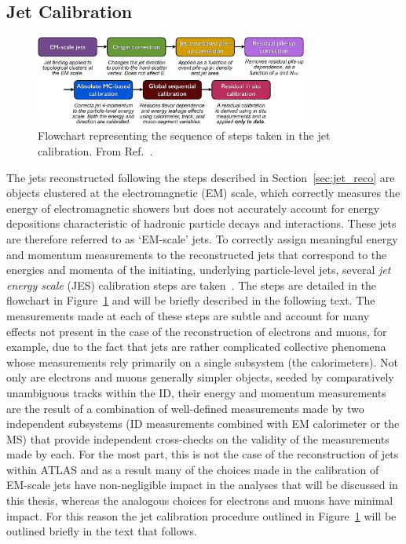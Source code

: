 \subsection{Jet Calibration}
\label{sec:jet_calib}

\begin{figure}[!htb]
    \begin{center}
        \includegraphics[width=0.8\textwidth]{figures/chapter3/jets/jes_calibration_sequence}
        \caption{
            Flowchart representing the sequence of steps taken in the jet calibration.
            From Ref.~\cite{Aaboud:2017jcu}.
        }
        \label{fig:jes_sequence}
    \end{center}
\end{figure}

The jets reconstructed following the steps described in Section~\ref{sec:jet_reco} are objects clustered
at the electromagnetic (EM) scale, which correctly measures the energy of electromagnetic showers but does not
accurately account for energy depositions characteristic of hadronic particle decays and interactions.
These jets are therefore referred to as `EM-scale' jets.
To correctly assign meaningful energy and momentum measurements to the reconstructed jets that correspond
to the energies and momenta of the initiating, underlying particle-level jets, several \textit{jet energy scale} (JES) calibration steps are taken~\cite{Aaboud:2017jcu}.
The steps are detailed in the flowchart in Figure~\ref{fig:jes_sequence} and will be briefly described in the following text.
The measurements made at each of these steps are subtle and account for many effects not present in the case
of the reconstruction of electrons and muons, for example, due to the fact that jets are rather complicated collective phenomena
whose measurements rely primarily on a single subsystem (the calorimeters).
Not only are electrons and muons generally simpler objects, seeded by comparatively unambiguous tracks within the ID,
their energy and momentum measurements are the result of a combination of well-defined measurements made by two independent
subsystems (ID measurements combined with EM calorimeter or the MS) that provide independent cross-checks on the validity
of the measurements made by each.
For the most part, this is not the case of the reconstruction of jets within ATLAS and as a result many of the choices made in the calibration
of EM-scale jets have non-negligible impact in the analyses that will be discussed in this thesis, whereas the analogous
choices for electrons and muons have minimal impact.
For this reason the jet calibration procedure outlined in Figure~\ref{fig:jes_sequence} will be outlined briefly in the text that follows.

